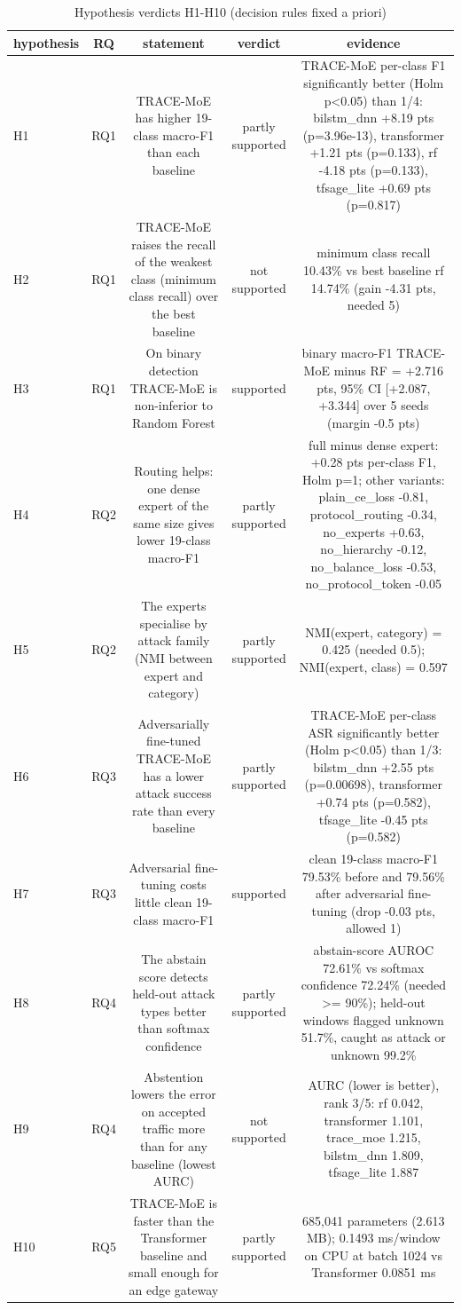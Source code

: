\begin{table}[htbp]
\centering
\caption{Hypothesis verdicts H1-H10 (decision rules fixed a priori)}
\label{tab:hypotheses}
\begin{tabular}{lcccc}
\toprule
hypothesis & RQ & statement & verdict & evidence \\
\midrule
H1 & RQ1 & TRACE-MoE has higher 19-class macro-F1 than each baseline & partly supported & TRACE-MoE per-class F1 significantly better (Holm p<0.05) than 1/4: bilstm\_dnn +8.19 pts (p=3.96e-13), transformer +1.21 pts (p=0.133), rf -4.18 pts (p=0.133), tfsage\_lite +0.69 pts (p=0.817) \\
H2 & RQ1 & TRACE-MoE raises the recall of the weakest class (minimum class recall) over the best baseline & not supported & minimum class recall 10.43\% vs best baseline rf 14.74\% (gain -4.31 pts, needed 5) \\
H3 & RQ1 & On binary detection TRACE-MoE is non-inferior to Random Forest & supported & binary macro-F1 TRACE-MoE minus RF = +2.716 pts, 95\% CI [+2.087, +3.344] over 5 seeds (margin -0.5 pts) \\
H4 & RQ2 & Routing helps: one dense expert of the same size gives lower 19-class macro-F1 & partly supported & full minus dense expert: +0.28 pts per-class F1, Holm p=1; other variants: plain\_ce\_loss -0.81, protocol\_routing -0.34, no\_experts +0.63, no\_hierarchy -0.12, no\_balance\_loss -0.53, no\_protocol\_token -0.05 \\
H5 & RQ2 & The experts specialise by attack family (NMI between expert and category) & partly supported & NMI(expert, category) = 0.425 (needed 0.5); NMI(expert, class) = 0.597 \\
H6 & RQ3 & Adversarially fine-tuned TRACE-MoE has a lower attack success rate than every baseline & partly supported & TRACE-MoE per-class ASR significantly better (Holm p<0.05) than 1/3: bilstm\_dnn +2.55 pts (p=0.00698), transformer +0.74 pts (p=0.582), tfsage\_lite -0.45 pts (p=0.582) \\
H7 & RQ3 & Adversarial fine-tuning costs little clean 19-class macro-F1 & supported & clean 19-class macro-F1 79.53\% before and 79.56\% after adversarial fine-tuning (drop -0.03 pts, allowed 1) \\
H8 & RQ4 & The abstain score detects held-out attack types better than softmax confidence & partly supported & abstain-score AUROC 72.61\% vs softmax confidence 72.24\% (needed >= 90\%); held-out windows flagged unknown 51.7\%, caught as attack or unknown 99.2\% \\
H9 & RQ4 & Abstention lowers the error on accepted traffic more than for any baseline (lowest AURC) & not supported & AURC (lower is better), rank 3/5: rf 0.042, transformer 1.101, trace\_moe 1.215, bilstm\_dnn 1.809, tfsage\_lite 1.887 \\
H10 & RQ5 & TRACE-MoE is faster than the Transformer baseline and small enough for an edge gateway & partly supported & 685,041 parameters (2.613 MB); 0.1493 ms/window on CPU at batch 1024 vs Transformer 0.0851 ms \\
\bottomrule
\end{tabular}
\end{table}